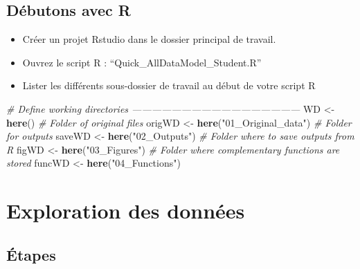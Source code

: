 \documentclass[french,a4paper]{article}
\newenvironment{Shaded}{\begin{snugshade}}{\end{snugshade}}
\newcommand{\CommentTok}[1]{\textcolor[rgb]{0.56,0.35,0.01}{\textit{#1}}}
\newcommand{\KeywordTok}[1]{\textcolor[rgb]{0.13,0.29,0.53}{\textbf{#1}}}
\newcommand{\NormalTok}[1]{#1}
\newcommand{\StringTok}[1]{\textcolor[rgb]{0.31,0.60,0.02}{#1}}
\providecommand{\tightlist}{%
  \setlength{\itemsep}{0pt}\setlength{\parskip}{0pt}}
\begin{document}
\hypertarget{debutons-avec-r}{%
\subsection{Débutons avec R}\label{debutons-avec-r}}

\begin{itemize}
\tightlist
\item
  Créer un projet Rstudio dans le dossier principal de travail.
\item
  Ouvrez le script R : ``Quick\_AllDataModel\_Student.R''
\item
  Lister les différents sous-dossier de travail au début de votre script
  R
\end{itemize}

\begin{Shaded}
\begin{Highlighting}[]
\CommentTok{# Define working directories ---------------------------------------------------}
\NormalTok{WD <-}\StringTok{ }\KeywordTok{here}\NormalTok{()}
\CommentTok{# Folder of original files}
\NormalTok{origWD <-}\StringTok{ }\KeywordTok{here}\NormalTok{(}\StringTok{"01_Original_data"}\NormalTok{)}
\CommentTok{# Folder for outputs}
\NormalTok{saveWD <-}\StringTok{ }\KeywordTok{here}\NormalTok{(}\StringTok{"02_Outputs"}\NormalTok{)}
\CommentTok{# Folder where to save outputs from R}
\NormalTok{figWD <-}\StringTok{ }\KeywordTok{here}\NormalTok{(}\StringTok{"03_Figures"}\NormalTok{)}
\CommentTok{# Folder where complementary functions are stored}
\NormalTok{funcWD <-}\StringTok{ }\KeywordTok{here}\NormalTok{(}\StringTok{"04_Functions"}\NormalTok{)}
\end{Highlighting}
\end{Shaded}

\hypertarget{exploration-des-donnees-1}{%
\section{Exploration des données}\label{exploration-des-donnees-1}}

\hypertarget{etapes}{%
\subsection{Étapes}\label{etapes}}

\end{document}
